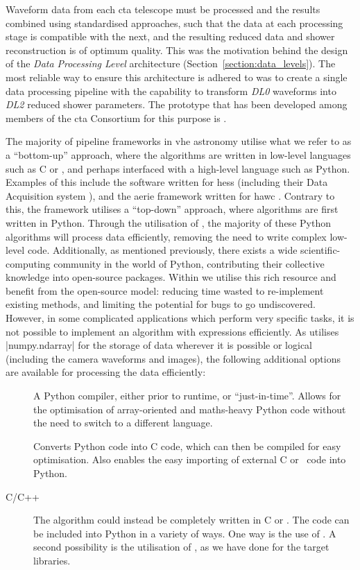 \noindent Waveform data from each \gls{cta} telescope must be processed and the results combined using standardised approaches, such that the data at each processing stage is compatible with the next, and the resulting reduced data and shower reconstruction is of optimum quality. This was the motivation behind the design of the \textit{Data Processing Level} architecture (Section~\ref{section:data_levels}). The most reliable way to ensure this architecture is adhered to was to create a single data processing pipeline with the capability to transform \textit{DL0} waveforms into \textit{DL2} reduced shower parameters. The prototype that has been developed among members of the \gls{cta} Consortium for this purpose is .

The majority of pipeline frameworks in \gls{vhe} astronomy utilise what we refer to as a ``bottom-up'' approach, where the algorithms are written in low-level languages such as C or \cpp, and perhaps interfaced with a high-level language such as Python. Examples of this include the software written for \gls{hess} (including their Data Acquisition system \cite{Balzer2014}), and the \gls{aerie} framework written for \gls{hawc} \cite{Abeysekara2018}. Contrary to this, the  framework utilises a ``top-down'' approach, where algorithms are first written in Python. Through the utilisation of , the majority of these Python algorithms will process data efficiently, removing the need to write complex low-level code. Additionally, as mentioned previously, there exists a wide scientific-computing community in the world of Python, contributing their collective knowledge into open-source packages. Within  we utilise this rich resource and benefit from the open-source model: reducing time wasted to re-implement existing methods, and limiting the potential for bugs to go undiscovered. However, in some complicated applications which perform very specific tasks, it is not possible to implement an algorithm with  expressions efficiently. As  utilises |numpy.ndarray| for the storage of data wherever it is possible or logical (including the camera waveforms and images), the following additional options are available for processing the data efficiently:

\begin{description}
\item [] A Python compiler, either prior to runtime, or ``just-in-time''. Allows for the optimisation of array-oriented and maths-heavy Python code without the need to switch to a different language.
\item [] Converts Python code into C code, which can then be compiled for easy optimisation. Also enables the easy importing of external C or \cpp~code into Python.
\item [C/C++] The algorithm could instead be completely written in C or \cpp. The code can be included into Python in a variety of ways. One way is the use of . A second possibility is the utilisation of , as we have done for the \gls{target} libraries.
\end{description}

